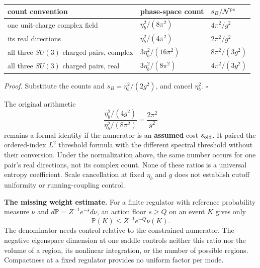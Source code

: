 \documentclass[11pt,a4paper]{article}
\begin{document}
\begin{longtable}[]{@{}
  >{\raggedright\arraybackslash}p{}
  >{\raggedright\arraybackslash}p{}
  >{\raggedright\arraybackslash}p{}@{}}
\toprule\noalign{}
\begin{minipage}[b]{\linewidth}\raggedright
count convention
\end{minipage} & \begin{minipage}[b]{\linewidth}\raggedright
phase-space count
\end{minipage} & \begin{minipage}[b]{\linewidth}\raggedright
\(s_B/\mathcal N^{\rm ps}\)
\end{minipage} \\
\midrule\noalign{}
\endhead
\bottomrule\noalign{}
\endlastfoot
one unit-charge complex field & \(\eta_b^2/(8\pi^2)\) &
\(4\pi^2/g^2\) \\
its real directions & \(\eta_b^2/(4\pi^2)\) & \(2\pi^2/g^2\) \\
all three \(SU(3)\) charged pairs, complex & \(3\eta_b^2/(16\pi^2)\) &
\(8\pi^2/(3g^2)\) \\
all three \(SU(3)\) charged pairs, real & \(3\eta_b^2/(8\pi^2)\) &
\(4\pi^2/(3g^2)\) \\
\end{longtable}

\emph{Proof.} Substitute the counts and \(s_B=\eta_b^2/(2g^2)\), and
cancel \(\eta_b^2\). \(\square\)

The original arithmetic \[\frac{\eta_b^2/(4g^2)}{\eta_b^2/(8\pi^2)}
=\frac{2\pi^2}{g^2}\] remains a formal identity if the numerator is an
\textbf{assumed} cost \(s_{\rm old}\). It paired the ordered-index
\(L^2\) threshold formula with the different spectral threshold without
their conversion. Under the normalization above, the same number occurs
for one pair's real directions, not its complex count. None of these
ratios is a universal entropy coefficient. Scale cancellation at fixed
\(\eta_b\) and \(g\) does not establish cutoff uniformity or
running-coupling control.

\textbf{The missing weight estimate.} For a finite regulator with
reference probability measure \(\nu\) and
\(d\mathbb P=Z^{-1}e^{-s}d\nu\), an action floor \(s\ge Q\) on an event
\(K\) gives only \[\mathbb P(K)\le Z^{-1}e^{-Q}\nu(K).\] The denominator
needs control relative to the constrained numerator. The negative
eigenspace dimension at one saddle controls neither this ratio nor the
volume of a region, its nonlinear integration, or the number of possible
regions. Compactness at a fixed regulator provides no uniform factor per
mode.
\end{document}
